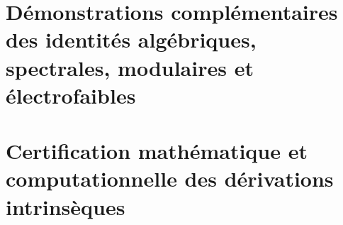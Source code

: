 \chapter{Démonstrations complémentaires des identités algébriques, spectrales, modulaires et électrofaibles}
\label{hmt:p3:app:demostraciones-complementarias}


\chapter{Certification mathématique et computationnelle des dérivations intrinsèques}
\label{hmt:p3:app:certificacion-constantes}

